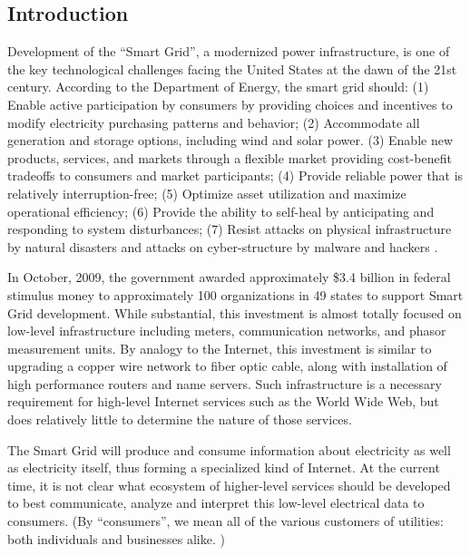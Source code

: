 
\subsection{Introduction}

Development of the ``Smart Grid'', a modernized power infrastructure, is
one of the key technological challenges facing the United States at the
dawn of the 21st century. According to the Department of Energy, the smart
grid should: (1) Enable active participation by consumers by providing
choices and incentives to modify electricity purchasing patterns and
behavior; (2) Accommodate all generation and storage options, including
wind and solar power.  (3) Enable new products, services, and markets
through a flexible market providing cost-benefit tradeoffs to consumers and
market participants; (4) Provide reliable power that is relatively
interruption-free; (5) Optimize asset utilization and maximize operational
efficiency; (6) Provide the ability to self-heal by anticipating and
responding to system disturbances; (7) Resist attacks on physical
infrastructure by natural disasters and attacks on cyber-structure by
malware and hackers \cite{NETL:GridCharacteristics}.

In October, 2009, the government awarded approximately \$3.4 billion in
federal stimulus money to approximately 100 organizations in 49 states to
support Smart Grid development.  While substantial, this investment is
almost totally focused on low-level infrastructure including meters,
communication networks, and phasor measurement units.  By analogy to the
Internet, this investment is similar to upgrading a copper wire network to
fiber optic cable, along with installation of high performance routers and
name servers.  Such infrastructure is a necessary requirement for
high-level Internet services such as the World Wide Web, but does
relatively little to determine the nature of those services.

The Smart Grid will produce and consume information about electricity as
well as electricity itself, thus forming a specialized kind of Internet. At
the current time, it is not clear what ecosystem of higher-level services
should be developed to best communicate, analyze and interpret this
low-level electrical data to consumers.  (By ``consumers'', we mean all of
the various customers of utilities: both individuals and businesses
alike. )


